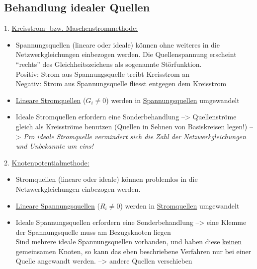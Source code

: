 \subsection{Behandlung idealer Quellen}
1. \underline{Kreisstrom- bzw. Maschenstrommethode:}
\begin{itemize}
	\item Spannungsquellen (lineare oder ideale) können ohne weiteres in die Netzwerkgleichungen einbezogen werden. Die Quellenspannung erscheint "`rechts"' des Gleichheitszeichens als sogenannte Störfunktion. \\
	Positiv: Strom aus Spannungsquelle treibt Kreisstrom an \\
	Negativ: Strom aus Spannungsquelle fliesst entgegen dem Kreisstrom
	\item \underline{Lineare Stromquellen} ($G_{i} \not = 0$) werden in \underline{Spannungsquellen} umgewandelt
	\item Ideale Stromquellen erfordern eine Sonderbehandlung --> Quellenströme gleich als Kreisströme benutzen (Quellen in Sehnen von Basiskreisen legen!) --> \textit{Pro ideale Stromquelle vermindert sich die Zahl der Netzwerkgleichungen und Unbekannte um eins!}
\end{itemize}
2. \underline{Knotenpotentialmethode:}
\begin{itemize}
	\item Stromquellen (lineare oder ideale) können problemlos in die Netzwerkgleichungen einbezogen werden.
	\item \underline{Lineare Spannungsquellen} ($R_{i} \not = 0$) werden in \underline{Stromquellen} umgewandelt
	\item Ideale Spannungsquellen erfordern eine Sonderbehandlung --> eine Klemme der Spannungsquelle muss am Bezugsknoten liegen\\
	Sind mehrere ideale Spannungsquellen vorhanden, und haben diese \underline{keinen} gemeinsamen Knoten, so kann das eben beschriebene Verfahren nur bei einer Quelle angewandt werden. --> andere Quellen verschieben
\end{itemize}
\newpage
